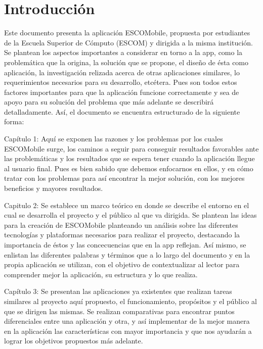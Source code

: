 \section{Introducción}

\noindent
Este documento presenta la aplicación ESCOMobile, propuesta por estudiantes de la Escuela Superior de Cómputo (ESCOM) y dirigida a la misma institución. Se plantean los aspectos importantes a considerar en torno a la app, como la problemática que la origina, la solución que se propone, el diseño de ésta como aplicación, la investigación relizada acerca de otras aplicaciones similares, lo requerimientos necesarios para su desarrollo, etcétera. Pues son todos estos factores importantes para que la aplicación funcione correctamente y sea de apoyo para su solución del problema que más adelante se describirá detalladamente. Así, el documento se encuentra estructurado de la siguiente forma:
\newline

\noindent
Capítulo 1: Aquí se exponen las razones y los problemas por los cuales ESCOMobile surge, los caminos a seguir para conseguir resultados favorables ante las problemáticas y los resultados que se espera tener cuando la aplicación llegue al usuario final. Pues es bien sabido que debemos enfocarnos en ellos, y en cómo tratar con los problemas para así encontrar la mejor solución, con los mejores beneficios y mayores resultados. 
\newline

\noindent
Capitulo 2: Se establece un marco teórico en donde se describe el entorno en el cual se desarrolla el proyecto y el público al que va dirigida. Se plantean las ideas para la creación de ESCOMobile planteando un análisis sobre las diferentes tecnologías y plataformas necesarios para realizar el proyecto, destacando la importancia de éstos y las concecuencias que en la app reflejan. Así mismo, se enlistan las diferentes palabras y términos que a lo largo del documento y en la propia aplicación se utilizan, con el objetivo de contextualizar al lector para comprender mejor la aplicación, su estructura y lo que realiza.
\newline	

\noindent
Capítulo 3: Se presentan las aplicaciones ya existentes que realizan tareas similares al proyecto aquí propuesto, el funcionamiento, propósitos y el público al que se dirigen las mismas. Se realizan comparativas para encontrar puntos diferenciales entre una aplicación y otra, y así implementar de la mejor manera en la aplicación las características con mayor importancia y que nos ayudarán a lograr los objetivos propuestos más adelante.
\newline 

